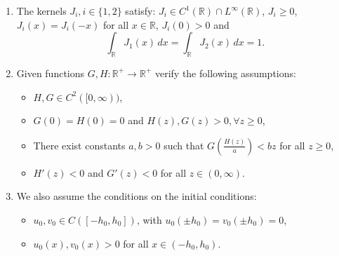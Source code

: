 \documentclass[a4paper,11pt]{amsart}
\theoremstyle{definition}
\numberwithin{equation}{section}
\theoremstyle{definition}
\begin{document}
\begin{enumerate}
    \item[\textbf{(J)}] The kernels $J_i, i\in\{1,2\}$ satisfy: $J_i \in C^1(\mathbb{R}) \cap L^\infty(\mathbb{R})$, $J_i \geq 0$, $J_i(x) = J_i(-x)$ for all $x\in\mathbb{R}$, $J_i(0) > 0$ and
         \[
        \int_{\mathbb{R}} J_1(x)\, dx = \int_{\mathbb{R}} J_2(x)\, dx = 1.
        \]

    \item[\textbf{(GH)}] Given functions $G, H: \mathbb{R}^+ \to \mathbb{R}^+$ verify the following assumptions:
    \begin{itemize}
        \item $H, G \in C^2([0, \infty))$,
        \item $G(0) = H(0) = 0$ and $H(z), G(z) > 0, \forall z \geq 0$,
        \item There exist constants $a, b > 0$ such that $G\left(\frac{H(z)}{a}\right) < bz$ for all $z \geq 0$,
        \item $H'(z) < 0$ and $G'(z) < 0$ for all $z \in (0, \infty)$.
    \end{itemize}

    \item[\textbf{(IC)}] We also assume the conditions on the initial conditions:
    \begin{itemize}
        \item $u_0, v_0 \in C([-h_0, h_0])$, with $u_0(\pm h_0) = v_0(\pm h_0) = 0$,
        \item $u_0(x), v_0(x) > 0$ for all $x \in (-h_0, h_0)$.
    \end{itemize}
\end{enumerate}
\end{document}
